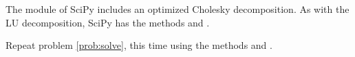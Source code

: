 The  module of SciPy includes an optimized Cholesky decomposition. 
As with the LU decomposition, SciPy has the methods  and .

\begin{problem}[Optional]
Repeat problem \ref{prob:solve}, this time using the methods  and .
\end{problem} 
